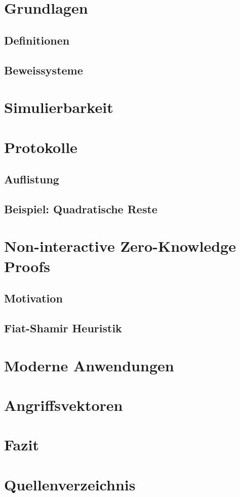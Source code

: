 \documentclass {article}
\begin{document}
\section{Grundlagen}
\subsection{Definitionen}
\subsection{Beweissysteme}
\section{Simulierbarkeit}
\section{Protokolle}
\subsection{Auflistung}
\subsection{Beispiel: Quadratische Reste}
\section{Non-interactive Zero-Knowledge Proofs}
\subsection{Motivation}
\subsection{Fiat-Shamir Heuristik}
\section{Moderne Anwendungen}
\section{Angriffsvektoren}
\section{Fazit}
\section{Quellenverzeichnis}

\nocite{BG89}
\nocite{BM89}
\nocite{GMIR85}
\nocite{GO90}
\nocite{KZKP}
\nocite{PrSa14}
\nocite{RS91}
\nocite{Wik1}
\nocite{Wik2}

\printbibliography


  
\end{document}
